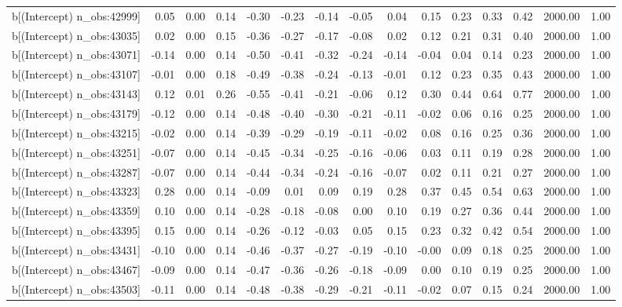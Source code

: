 \begin{table}[ht]
\begin{tabular}{rrrrrrrrrrrrrrr}
  b[(Intercept) n\_obs:42999] & 0.05 & 0.00 & 0.14 & -0.30 & -0.23 & -0.14 & -0.05 & 0.04 & 0.15 & 0.23 & 0.33 & 0.42 & 2000.00 & 1.00 \\ 
  b[(Intercept) n\_obs:43035] & 0.02 & 0.00 & 0.15 & -0.36 & -0.27 & -0.17 & -0.08 & 0.02 & 0.12 & 0.21 & 0.31 & 0.40 & 2000.00 & 1.00 \\ 
  b[(Intercept) n\_obs:43071] & -0.14 & 0.00 & 0.14 & -0.50 & -0.41 & -0.32 & -0.24 & -0.14 & -0.04 & 0.04 & 0.14 & 0.23 & 2000.00 & 1.00 \\ 
  b[(Intercept) n\_obs:43107] & -0.01 & 0.00 & 0.18 & -0.49 & -0.38 & -0.24 & -0.13 & -0.01 & 0.12 & 0.23 & 0.35 & 0.43 & 2000.00 & 1.00 \\ 
  b[(Intercept) n\_obs:43143] & 0.12 & 0.01 & 0.26 & -0.55 & -0.41 & -0.21 & -0.06 & 0.12 & 0.30 & 0.44 & 0.64 & 0.77 & 2000.00 & 1.00 \\ 
  b[(Intercept) n\_obs:43179] & -0.12 & 0.00 & 0.14 & -0.48 & -0.40 & -0.30 & -0.21 & -0.11 & -0.02 & 0.06 & 0.16 & 0.25 & 2000.00 & 1.00 \\ 
  b[(Intercept) n\_obs:43215] & -0.02 & 0.00 & 0.14 & -0.39 & -0.29 & -0.19 & -0.11 & -0.02 & 0.08 & 0.16 & 0.25 & 0.36 & 2000.00 & 1.00 \\ 
  b[(Intercept) n\_obs:43251] & -0.07 & 0.00 & 0.14 & -0.45 & -0.34 & -0.25 & -0.16 & -0.06 & 0.03 & 0.11 & 0.19 & 0.28 & 2000.00 & 1.00 \\ 
  b[(Intercept) n\_obs:43287] & -0.07 & 0.00 & 0.14 & -0.44 & -0.34 & -0.24 & -0.16 & -0.07 & 0.02 & 0.11 & 0.21 & 0.27 & 2000.00 & 1.00 \\ 
  b[(Intercept) n\_obs:43323] & 0.28 & 0.00 & 0.14 & -0.09 & 0.01 & 0.09 & 0.19 & 0.28 & 0.37 & 0.45 & 0.54 & 0.63 & 2000.00 & 1.00 \\ 
  b[(Intercept) n\_obs:43359] & 0.10 & 0.00 & 0.14 & -0.28 & -0.18 & -0.08 & 0.00 & 0.10 & 0.19 & 0.27 & 0.36 & 0.44 & 2000.00 & 1.00 \\ 
  b[(Intercept) n\_obs:43395] & 0.15 & 0.00 & 0.14 & -0.26 & -0.12 & -0.03 & 0.05 & 0.15 & 0.23 & 0.32 & 0.42 & 0.54 & 2000.00 & 1.00 \\ 
  b[(Intercept) n\_obs:43431] & -0.10 & 0.00 & 0.14 & -0.46 & -0.37 & -0.27 & -0.19 & -0.10 & -0.00 & 0.09 & 0.18 & 0.25 & 2000.00 & 1.00 \\ 
  b[(Intercept) n\_obs:43467] & -0.09 & 0.00 & 0.14 & -0.47 & -0.36 & -0.26 & -0.18 & -0.09 & 0.00 & 0.10 & 0.19 & 0.25 & 2000.00 & 1.00 \\ 
  b[(Intercept) n\_obs:43503] & -0.11 & 0.00 & 0.14 & -0.48 & -0.38 & -0.29 & -0.21 & -0.11 & -0.02 & 0.07 & 0.15 & 0.24 & 2000.00 & 1.00 \\ 

\end{tabular}
\end{table}
